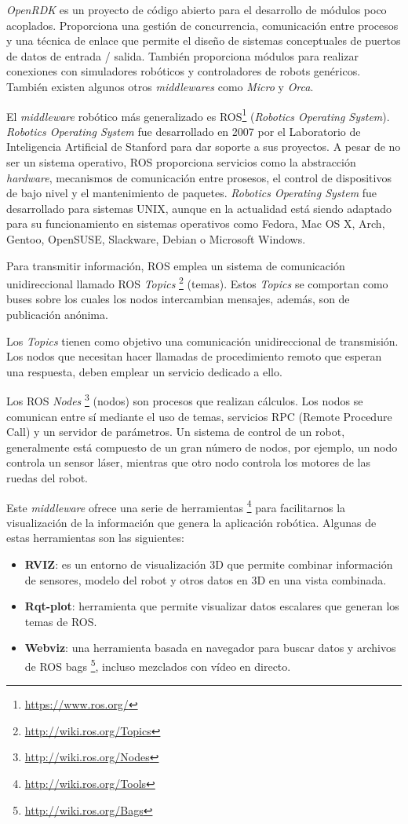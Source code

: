 \documentclass[a4paper, 12pt]{book}
\begin{document}
\emph{OpenRDK} es un proyecto de código abierto para el desarrollo de módulos poco acoplados. Proporciona una gestión de concurrencia, comunicación entre procesos y una técnica de enlace que permite el diseño de sistemas conceptuales de puertos de datos de entrada / salida. También proporciona módulos para realizar conexiones con simuladores robóticos y controladores de robots genéricos. También existen algunos otros \emph{middlewares} como \emph{Micro} y \emph{Orca}.

El \textit{middleware} robótico más generalizado es ROS\footnote{\url{https://www.ros.org/}}
 (\textit{Robotics Operating System}). \textit{Robotics Operating System} fue desarrollado en 2007 por el Laboratorio de Inteligencia Artificial de Stanford para dar soporte a sus proyectos. A pesar de no ser un sistema operativo, ROS proporciona servicios como la abstracción \textit{hardware}, mecanismos de comunicación entre prosesos, el control de dispositivos de bajo nivel y el mantenimiento de paquetes. \textit{Robotics Operating System} fue desarrollado para sistemas UNIX, aunque en la actualidad está siendo adaptado para su funcionamiento en sistemas operativos como Fedora, Mac OS X, Arch, Gentoo, OpenSUSE, Slackware, Debian o Microsoft Windows.
 
Para transmitir información, ROS emplea un sistema de comunicación unidireccional llamado ROS \emph{Topics} \footnote{\url{http://wiki.ros.org/Topics}} (temas). Estos \emph{Topics} se comportan como buses sobre los cuales los nodos intercambian mensajes, además, son de publicación anónima.

Los \emph{Topics} tienen como objetivo una comunicación unidireccional de transmisión. Los nodos que necesitan hacer llamadas de procedimiento remoto que esperan una respuesta, deben emplear un servicio dedicado a ello.

Los ROS \emph{Nodes} \footnote{\url{http://wiki.ros.org/Nodes}} (nodos) son procesos que realizan cálculos. Los nodos se comunican entre sí mediante el uso de temas, servicios RPC (Remote Procedure Call) y un servidor de parámetros. Un sistema de control de un robot, generalmente está compuesto de un gran número de nodos, por ejemplo, un nodo controla un sensor láser, mientras que otro nodo controla los motores de las ruedas del robot.

Este \emph{middleware} ofrece una serie de herramientas \footnote{\url{http://wiki.ros.org/Tools}} para facilitarnos la visualización de la información que genera la aplicación robótica. Algunas de estas herramientas son las siguientes:
\nolinebreak
\begin{itemize}
\itemsep 0em
\item \textbf{RVIZ}: es un entorno de visualización 3D que permite combinar información de sensores, modelo del robot y otros datos en 3D en una vista combinada.
\item \textbf{Rqt-plot}: herramienta que permite visualizar datos escalares que generan los temas de ROS.
\item \textbf{Webviz}: una herramienta basada en navegador para buscar datos y archivos de ROS bags \footnote{\url{http://wiki.ros.org/Bags}}, incluso mezclados con vídeo en directo.
\end{itemize}
\end{document}
